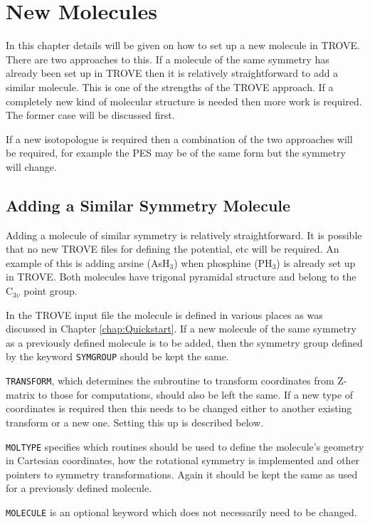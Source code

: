 
\chapter{New Molecules}
\label{chap:newmol}

In this chapter details will be given on how to set up a new molecule in TROVE. 
There are two approaches to this. If a molecule of the same symmetry has already been set up in TROVE then it is
relatively straightforward to add a similar molecule. This is one of the strengths of the TROVE approach. 
If a completely new kind of molecular structure is needed then
more work is required. The former case will be discussed first. 

If a new isotopologue is required then a combination of the two approaches will be required, for example the PES may 
be of the same form but the symmetry will change. 


\section{Adding a Similar Symmetry Molecule}
Adding a molecule of similar symmetry is relatively straightforward. It is possible that no new TROVE files for defining 
the potential, etc will be required. An example of this is adding arsine (AsH$_3$) when
phosphine (PH$_3$) is already set up in TROVE. Both molecules have trigonal pyramidal structure and belong to the 
C$_{3v}$ point group. 

In the TROVE input file the molecule is defined in various places as was discussed in Chapter \ref{chap:Quickstart}. If a 
new molecule of the same symmetry as a previously defined molecule is to be added, then the symmetry group 
defined by the keyword \verb|SYMGROUP| should be kept the same.

\verb|TRANSFORM|, which determines the subroutine to transform coordinates from Z-matrix to those for computations, 
should also be left the same. If a new type of coordinates is required then this needs to be changed either to another 
existing transform or a new one. Setting this up is described below. 

\verb|MOLTYPE| specifies which routines should be used to define the molecule's geometry in Cartesian coordinates,
how the rotational symmetry is implemented and other pointers to symmetry transformations. Again it should be kept the same 
as used for a previously defined molecule. 

\verb|MOLECULE| is an optional keyword which does not necessarily need to be changed. 


